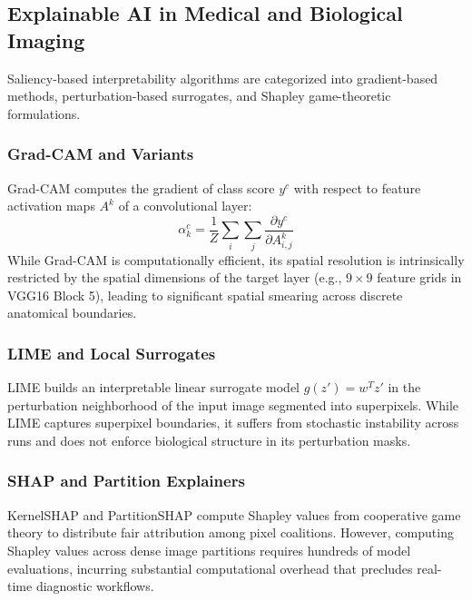 \documentclass[conference]{IEEEtran}
\begin{document}
\subsection{Explainable AI in Medical and Biological Imaging}
Saliency-based interpretability algorithms are categorized into gradient-based methods, perturbation-based surrogates, and Shapley game-theoretic formulations.
\subsubsection{Grad-CAM and Variants}
Grad-CAM \cite{selvaraju2017gradcam} computes the gradient of class score $y^c$ with respect to feature activation maps $A^k$ of a convolutional layer:
\begin{equation}
\alpha_k^c = \frac{1}{Z}\sum_{i}\sum_{j} \frac{\partial y^c}{\partial A_{i,j}^k}
\end{equation}
While Grad-CAM is computationally efficient, its spatial resolution is intrinsically restricted by the spatial dimensions of the target layer (e.g., $9 \times 9$ feature grids in VGG16 Block 5), leading to significant spatial smearing across discrete anatomical boundaries.

\subsubsection{LIME and Local Surrogates}
LIME \cite{ribeiro2016lime} builds an interpretable linear surrogate model $g(z') = w^T z'$ in the perturbation neighborhood of the input image segmented into superpixels. While LIME captures superpixel boundaries, it suffers from stochastic instability across runs and does not enforce biological structure in its perturbation masks.

\subsubsection{SHAP and Partition Explainers}
KernelSHAP and PartitionSHAP \cite{lundberg2017shap} compute Shapley values from cooperative game theory to distribute fair attribution among pixel coalitions. However, computing Shapley values across dense image partitions requires hundreds of model evaluations, incurring substantial computational overhead that precludes real-time diagnostic workflows.
\end{document}
